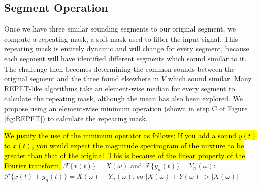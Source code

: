 \documentclass{article}
\begin{document}




\subsection{Segment Operation}
Once we have three similar sounding segments to our original segment, we compute a repeating mask, a soft mask used to filter the input signal. This repeating mask is entirely dynamic and will change for every segment, because each segment will have identified different segments which sound similar to it. The challenge then becomes determining the common sounds between the original segment and the three found elsewhere in $V$ which sound similar. Many REPET-like algorithms take an element-wise median for every segment to calculate the repeating mask, although the mean has also been explored. We propose using an element-wise minimum operation (shown in step C of Figure \ref{fig:REPET}) to calculate the repeating mask.



\hl{We justify the use of the minimum operator as follows: If you add a sound $y(t)$ to $x(t)$, you would expect the magnitude spectrogram of the mixture to be greater than that of the original. This is because of the linear property of the Fourier transform,} $\mathcal{F}\{x(t)\} = X(\omega)$ and $\mathcal{F}\{y_n(t)\}  = Y_n(\omega)$: $\mathcal{F}\{x(t)+y_n(t)\}  = X(\omega) + Y_n(\omega)$, so $|X(\omega)+Y(\omega)| > |X(\omega)|$
\end{document}
